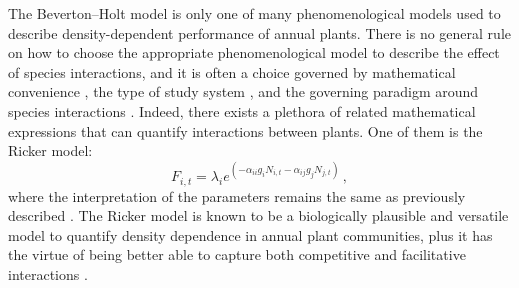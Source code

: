 The Beverton--Holt model is only one of many phenomenological models used to describe density-dependent performance of annual plants. There is no general rule on how to choose the appropriate phenomenological model to describe the effect of species interactions, and it is often a choice governed by mathematical convenience \citep{mayfield2017higher}, the type of study system \citep{godwin2020empiricist}, and the governing paradigm around species interactions \citep{martyn2021identifying}. Indeed, there exists a plethora of related mathematical expressions that can quantify interactions between plants. One of them is the Ricker  model:
 \begin{equation}
 \label{Ricker}
   F_{i,t} = \lambda_{i} e^{(- \alpha_{ii}g_{i}N_{i,t} - \alpha_{ij}g_{j}N_{j,t})}\,,
\end{equation}
where the interpretation of the parameters remains the same as previously described \citep{ricker1954effects}. The Ricker model is known to be a biologically plausible and versatile model to quantify density dependence in annual plant communities, plus it has the virtue of being better able to capture both competitive and facilitative interactions \citep{mayfield2017higher,bimler_accurate_2018}.


